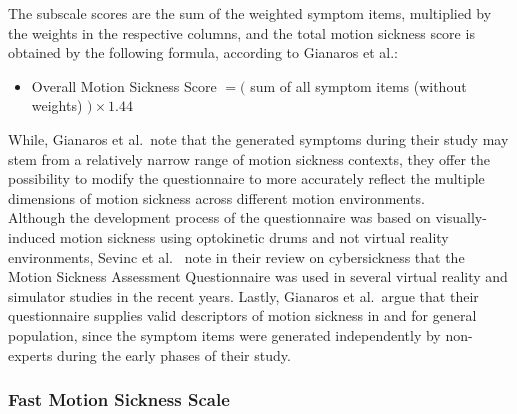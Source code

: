 The subscale scores are the sum of the weighted symptom items, multiplied by the weights in the respective columns, and
the total motion sickness score is obtained by the following formula, according to Gianaros et al.:
\begin{itemize}
    \item Overall Motion Sickness Score $= ($ sum of all symptom items (without weights) $) \times 1.44$
\end{itemize}
While, Gianaros et al.\ note that the generated symptoms during their study may stem from a relatively narrow range
of motion sickness contexts, they offer the possibility to modify the questionnaire to more accurately reflect the
multiple dimensions of motion sickness across different motion environments.
\\
Although the development process of the questionnaire was based on visually-induced motion sickness using optokinetic
drums and not virtual reality environments, Sevinc et al.~\cite{Sevinc2020} note in their review on cybersickness
that the Motion Sickness Assessment Questionnaire was used in several virtual reality and simulator studies in the
recent years.
Lastly, Gianaros et al.\ argue that their questionnaire supplies valid descriptors of motion sickness in and for
general population, since the symptom items were generated independently by non-experts during the early phases of
their study.

\subsubsection{Fast Motion Sickness Scale}\label{subsubsec:fast-motion-sickness-scale}

